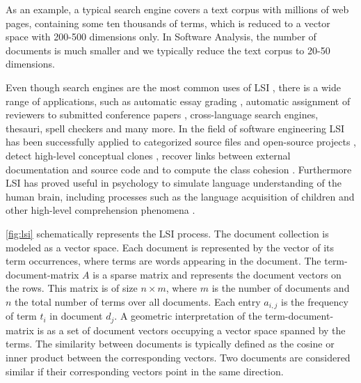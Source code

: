 As an example, a typical search engine covers a text corpus with millions of web pages, containing some ten thousands of terms, which is reduced to a vector space with 200-500 dimensions only. In Software Analysis, the number of documents is much smaller and we typically reduce the text corpus to 20-50 dimensions.

Even though search engines are the most common uses of LSI \cite{Berr94a}, there is a wide range of applications, such as automatic essay grading \cite{Folt99a}, automatic assignment of reviewers to submitted conference papers \cite{Duma92a},  cross-language search engines, thesauri, spell checkers and many more.
In the field of software engineering LSI has been successfully applied to categorized source files \cite{Male00a} and open-source projects \cite{Kawa04a}, detect high-level conceptual clones \cite{Marc01a}, recover links between external documentation and source code \cite{Luci04a,Marc05a} and to compute the class cohesion \cite{Marc05a}. Furthermore LSI has proved useful in psychology to simulate language understanding of the human brain, including processes such as the language acquisition of children and other high-level comprehension phenomena \cite{Land97a}.

\autoref{fig:lsi} schematically represents the LSI process. The document collection is modeled as a vector space. Each document is represented by the vector of its term occurrences, where terms are words appearing in the document. The term-document-matrix $A$ is a sparse matrix and represents the document vectors on the rows. This matrix is of size $n \times m$, where $m$ is the number of documents and $n$ the total number of terms over all documents. Each entry $a_{i,j}$ is the frequency of term $t_i$ in document $d_j$. A geometric interpretation of the term-document-matrix is as a set of document vectors occupying a vector space spanned by the terms. The similarity between documents is typically defined as the cosine or inner product between the corresponding vectors. Two documents are considered similar if their corresponding vectors point in the same direction.

